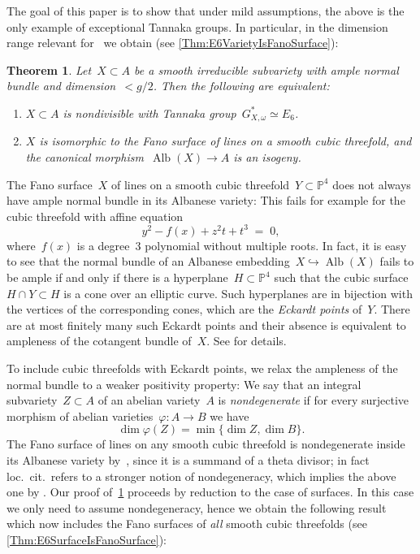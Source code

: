 \documentclass[a4paper]{amsart}
\newcommand{\bbP}{\mathbb{P}}
\newcommand{\into}{\hookrightarrow}
\renewcommand{\phi}{\varphi}
\DeclareMathOperator{\Alb}{Alb}
\theoremstyle{plain}
\newtheorem{theoremintro}{Theorem}
\theoremstyle{definition}
\numberwithin{equation}{section}
\begin{document}
\noindent
The goal of this paper is to show that under mild assumptions, the above is the only example of exceptional Tannaka groups. In particular, in the dimension range relevant for~\cite{KM, JKLM} we obtain (see \cref{Thm:E6VarietyIsFanoSurface}):

\begin{theoremintro} \label{Thm:E6VarietyIsFanoSurfaceIntro} Let~$X \subset A$ be a  smooth irreducible subvariety with ample normal bundle and dimension~$< g/2$. Then the following are equivalent:
\begin{enumerate}
\item $X\subset A$ is nondivisible with Tannaka group~$G_{X,\omega}^\ast \simeq E_6$.\smallskip
\item $X$ is isomorphic to the Fano surface of lines on a smooth cubic threefold, and the canonical morphism~$\Alb(X) \to A$ is an isogeny. 
\end{enumerate}
\end{theoremintro}

The Fano surface~$X$ of lines on a smooth cubic threefold~$Y \subset \bbP^4$ does not always have ample normal bundle in its Albanese variety: This fails for example for the cubic threefold with affine equation
\[ y^2 - f(x) + z^2 t + t^3 \;=\; 0,\]
where~$f(x)$ is a degree~$3$ polynomial without multiple roots. In fact, it is easy to see that the normal bundle of an Albanese embedding~$X \into \Alb(X)$ fails to be ample if and only if there is a hyperplane~$H \subset \bbP^4$ such that the cubic surface~$H \cap Y \subset H$ is a cone over an elliptic curve. Such hyperplanes are in bijection with the vertices of the corresponding cones, which are the \emph{Eckardt points} of~$Y$. There are at most finitely many such Eckardt points and their absence is equivalent to ampleness of the cotangent bundle of~$X$. See \cite[sect. 2]{RoulleauManuscripta} for details.\medskip 

To include cubic threefolds with Eckardt points, we relax the ampleness of the normal bundle to a weaker positivity property: We say that an integral subvariety~$Z \subset A$ of an abelian variety~$A$ is \emph{nondegenerate} if for every surjective morphism of abelian varieties~$\phi \colon A \to B$ we have
%
\[ \dim \phi(Z) = \min \{ \dim Z, \dim B \}.\]
%
The Fano surface of lines on any smooth cubic threefold is nondegenerate inside its Albanese variety by~\cite[th.~1]{SchreiederIMRN}, since it is a summand of a theta divisor; in fact loc.~cit.~refers to a stronger notion of nondegeneracy, which implies the above one by \cite[lemma II.12]{Ran}. Our proof of~\cref{Thm:E6VarietyIsFanoSurfaceIntro} proceeds by reduction to the case of surfaces. In this case we only need to assume nondegeneracy, hence we obtain the following result which now includes the Fano surfaces of \emph{all} smooth cubic threefolds  (see \cref{Thm:E6SurfaceIsFanoSurface}):
\end{document}
